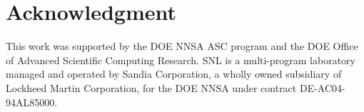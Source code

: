 \section*{Acknowledgment}
\parindent=0pt
This work was supported by the \gls{DOE} \gls{NNSA} \gls{ASC}
program and the \gls{DOE} Office of Advanced Scientific Computing Research. 
\gls{SNL} is a multi-program laboratory managed and operated by
Sandia Corporation, a wholly owned subsidiary of Lockheed Martin
Corporation, for the \gls{DOE} \gls{NNSA} under contract DE-AC04-94AL85000.


 
